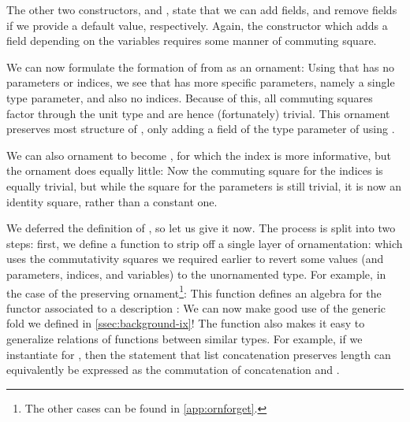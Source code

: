 The other two constructors,  and , state that we can add fields, and remove fields if we provide a default value, respectively. Again, the constructor  which adds a field depending on the variables requires some manner of commuting square.

We can now formulate the formation of  from \bN{} as an ornament:
Using that \bN{} has no parameters or indices, we see that  has more specific parameters, namely a single type parameter, and also no indices. Because of this, all commuting squares factor through the unit type and are hence (fortunately) trivial. This ornament preserves most structure of \bN{}, only adding a field of the type parameter of  using .

We can also ornament  to become , for which the index is more informative,
but the ornament does equally little:
Now the commuting square for the indices is equally trivial, but while the square for the parameters is still trivial, it is now an identity square, rather than a constant one.

We deferred the definition of , so let us give it now. The process is split into two steps: first, we define a function to strip off a single layer of ornamentation:
which uses the commutativity squares we required earlier to revert some values (and parameters, indices, and variables) to the unornamented type. For example, in the case of the  preserving ornament\footnote{The other cases can be found in \autoref{app:ornforget}.}:
This function defines an algebra for the functor associated to a description :
We can now make good use of the generic fold we defined in \autoref{ssec:background-ix}!
The function  also makes it easy to generalize relations of functions between similar types. For example, if we instantiate  for , then the statement that list concatenation preserves length can equivalently be expressed as the commutation of concatenation and .


%